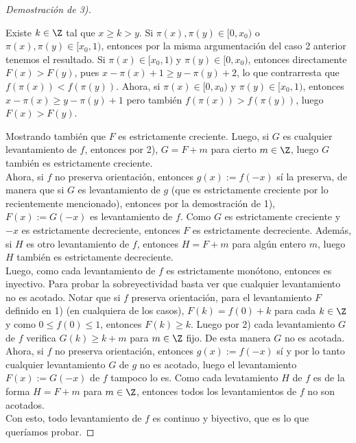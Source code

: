 \documentclass[	docname= Sistemas\ Din\'amicos,
				finished=1,
				semester=1,
				year=2017,
				professor=Godofredo\ Iommi,
				sigla=MAT2565]{apunte}
\begin{document}
\begin{proof}[Demostración de 3)]
\begin{casos}
		\item Existe $k \in \Z$ tal que $x \geq k > y$. Si $\pi(x), \pi(y) \in [0,x_{0})$ o $\pi(x), \pi(y) \in [x_{0},1)$, entonces por la misma argumentación del caso 2 anterior tenemos el resultado. Si $\pi(x) \in [x_{0}, 1)$ y $\pi(y) \in [0,x_{0})$, entonces directamente $F(x) > F(y)$, pues $x-\pi(x) + 1 \geq y - \pi(y) + 2$, lo que contrarresta que $f(\pi(x)) < f(\pi(y))$. Ahora, si $\pi(x) \in [0,x_{0})$ y $\pi(y) \in [x_{0}, 1)$, entonces $x - \pi(x) \geq y - \pi(y) + 1$ pero también $f(\pi(x)) > f(\pi(y))$, luego $F(x) > F(y)$.
	\end{casos}

Mostrando también que $F$ es estrictamente creciente. Luego, si $G$ es cualquier levantamiento de $f$, entonces por 2), $G = F + m$ para cierto $m \in \Z$, luego $G$ también es estrictamente creciente.	\\

Ahora, si $f$ no preserva orientación, entonces $g(x) := f(-x)$ sí la preserva, de manera que si $G$ es levantamiento de $g$ (que es estrictamente creciente por lo recientemente mencionado), entonces por la demostración de 1), $F(x) := G(-x)$ es levantamiento de $f$. Como $G$ es estrictamente creciente y $-x$ es estrictamente decreciente, entonces $F$ es estrictamente decreciente. Además, si $H$ es otro levantamiento de $f$, entonces $H = F + m$ para algún entero $m$, luego $H$ también es estrictamente decreciente.	\\

Luego, como cada levantamiento de $f$ es estrictamente monótono, entonces es inyectivo. Para probar la sobreyectividad basta ver que cualquier levantamiento no es acotado. Notar que si $f$ preserva orientación, para el levantamiento $F$ definido en 1) (en cualquiera de los casos), $F(k) = f(0) + k$ para cada $k \in \Z$ y como $0 \leq f(0) \leq 1$, entonces $F(k) \geq k$. Luego por 2) cada levantamiento $G$ de $f$ verifica $G(k) \geq k + m$ para $m \in \Z$ fijo. De esta manera $G$ no es acotada. Ahora, si $f$ no preserva orientación, entonces $g(x) := f(-x)$ sí y por lo tanto cualquier levantamiento $G$ de $g$ no es acotado, luego el levantamiento $F(x) := G(-x)$ de $f$ tampoco lo es. Como cada levatamiento $H$ de $f$ es de la forma $H = F + m$ para $m \in \Z$, entonces todos los levantamientos de $f$ no son acotados.	\\

Con esto, todo levantamiento de $f$ es continuo y biyectivo, que es lo que queríamos probar.
\end{proof}
\end{document}
